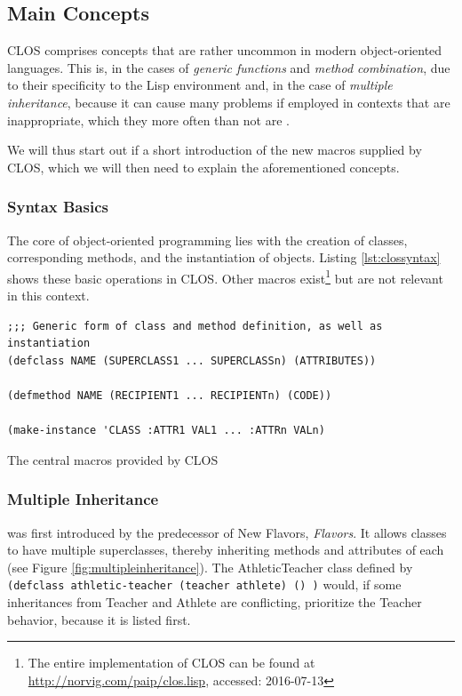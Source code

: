 \documentclass[oribibl]{llncs}
\begin{document}
\subsection{Main Concepts}
\label{sec:concepts}

CLOS comprises concepts that are rather uncommon in modern object-oriented languages. This is, in the cases of \emph{generic functions} and \emph{method combination}, due to their specificity to the Lisp environment and, in the case of \emph{multiple inheritance}, because it can cause many problems if employed in contexts that are inappropriate, which they more often than not are \cite{XXX}.  

We will thus start out if a short introduction of the new macros supplied by CLOS, which we will then need to explain the aforementioned concepts.


\subsubsection{Syntax Basics}
The core of object-oriented programming lies with the creation of classes, corresponding methods, and the instantiation of objects. Listing \ref{lst:clossyntax} shows these basic operations in CLOS. Other macros exist\footnote{The entire implementation of CLOS can be found at \url{http://norvig.com/paip/clos.lisp}, accessed: 2016-07-13} but are not relevant in this context.

\begin{listing}[]%
\begin{verbatim}
;;; Generic form of class and method definition, as well as instantiation
(defclass NAME (SUPERCLASS1 ... SUPERCLASSn) (ATTRIBUTES))

(defmethod NAME (RECIPIENT1 ... RECIPIENTn) (CODE))

(make-instance 'CLASS :ATTR1 VAL1 ... :ATTRn VALn)
\end{verbatim}
\caption{The central macros provided by CLOS}
\label{lst:clossyntax}
\end{listing}


\subsubsection{Multiple Inheritance}
\label{sec:mulinh}
was first introduced by the predecessor of New Flavors, \emph{Flavors}. It allows classes to have multiple superclasses, thereby inheriting methods and attributes of each (see Figure \ref{fig:multipleinheritance}). The AthleticTeacher class defined by \texttt{(defclass athletic-teacher (teacher athlete) () )} would, if some inheritances from Teacher and Athlete are conflicting, prioritize the Teacher behavior, because it is listed first.  
\end{document}
